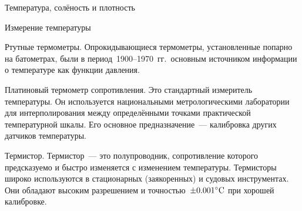 \begin{chapter}{Температура, солёность и плотность}
\begin{section}{Измерение температуры}
\begin{paragraph}{Ртутные термометры.}
Опрокидывающиеся термометры, установленные попарно на батометрах, были 
в период~1900--1970~гг.\ основным источником информации о температуре 
как функции давления. 
%
\end{paragraph}

\begin{paragraph}{Платиновый термометр сопротивления.} 
Это стандартный измеритель температуры. Он используется национальными
метрологическими лаборатории для интерполирования между определёнными
точками практической температурной шкалы. Его основное предназначение~---
калибровка других датчиков температуры.
%
\end{paragraph}

\begin{paragraph}{Термистор.}
Термистор~--- это полупроводник, сопротивление которого
предсказуемо и быстро изменяется с изменением
температуры. Термисторы широко используются в стационарных
(заякоренных) и судовых инструментах. Они обладают
высоким разрешением и точностью~$\pm{0.001}^\circ\mbox{C}$ при хорошей
калибровке.
%
\end{paragraph}


\end{section}
\end{chapter}
